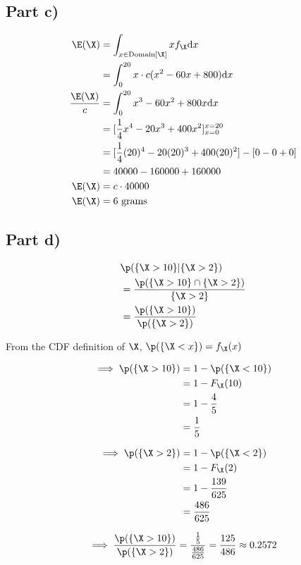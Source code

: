 \subsection{Part c)}

\begin{align}
\E(\X) &= \int _{x \in \mathrm{Domain}[\X]} xf_{\X}\mathrm{d}x \\
&= \int _0 ^{20} x \cdot c(x^2 - 60x + 800)\mathrm{d}x \\
\frac{\E(\X)}{c} &= \int _0 ^{20} x^3 - 60x^2 + 800x \mathrm{d}x \\
 &= [\frac{1}{4} x^4 - 20x^3 + 400x^2]^{x=20}_{x=0} \\
 &= [\frac{1}{4}(20)^4 - 20(20)^3 + 400 (20)^2] - [0 - 0 + 0] \\
 &= 40000 - 160000 + 160000 \\
\E(\X) &= c \cdot 40000 \\
\E(\X) &= 6 \text{ grams}
\end{align}

\subsection{Part d)}

\begin{align}
& \p (\{ \X > 10 \} | \{ \X > 2 \}) \\
&= \frac{\p(\{ \X > 10 \} \cap  \{ \X > 2 \})}{\{ \X > 2 \}} \\
&= \frac{\p(\{ \X > 10 \})}{\p (\{ \X > 2 \})}
\end{align}

From the CDF definition of $\X$, $\p (\{ \X < x \}) = f_{\X}(x)$

\begin{align}
\implies \p(\{ \X > 10 \}) &= 1 - \p (\{ \X < 10 \}) \\
&= 1 - F_{\X}(10) \\
&= 1 - \frac{4}{5} \\
&= \frac{1}{5}
\end{align}

\begin{align}
\implies \p(\{ \X > 2 \}) &= 1 - \p (\{ \X < 2 \}) \\
&= 1 - F_{\X}(2) \\
&= 1 - \frac{139}{625} \\
&= \frac{486}{625}
\end{align}

\begin{equation}
\label{eq:q2d-result}
\implies \frac{\p(\{ \X > 10 \})}{\p (\{ \X > 2 \})}
= \frac{\frac{1}{5}}{\frac{486}{625}}
= \frac{125}{486}
\approx 0.2572
\end{equation}

